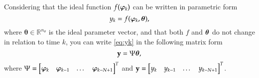 Considering that the ideal function $f(\bm{\varphi}_{k})$ can be written in parametric form
\begin{equation}
   y_k = f(\bm{\varphi}_{k},\bm{\theta}),
   \label{eq:yk}
\end{equation}
where $\bm{\theta} \in \mathbb{R}^{n_\theta}$ is the ideal parameter vector,
%
and that both $f$ and $\bm{\theta}$ do not change in relation to time $k$, you can write \eqref{eq:yk} in the following matrix form
\begin{equation}
   \mathrm{\mathbf{y}} = \Psi\bm{\theta},
   \label{eq:yMatrix}
\end{equation}
where $\Psi = \begin{bmatrix} \bm{\varphi}_{k} & \bm{\varphi}_{k-1} & \dots & \bm{\varphi}_ {k-N+1} \end{bmatrix}^T$ and $\mathrm{\mathbf{y}} = \begin{bmatrix} y_k & y_{k-1} & \dots & y_{k-N+1} \end{bmatrix}^T$.

